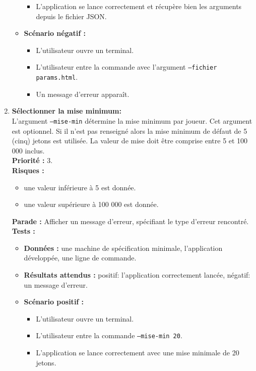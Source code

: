 \documentclass{article}
\newcommand{\code}[1]{\colorbox{light-gray}{\texttt{#1}}}
\begin{document}
\begin{enumerate}
\begin{itemize}
\begin{itemize}
            \item L'application se lance correctement et récupère bien les arguments depuis le fichier JSON.
        \end{itemize}
        \item \textbf{Scénario négatif :}
        \begin{itemize}
            \item L’utilisateur ouvre un terminal.
            \item L’utilisateur entre la commande avec l'argument \code{--fichier params.html}.
            \item Un message d'erreur apparaît.
        \end{itemize}
    \end{itemize}

    \item \textbf{Sélectionner la mise minimum:}\\
    L'argument \code{--mise-min} détermine la mise minimum par joueur. Cet argument est optionnel. Si il n'est pas renseigné alors la mise minimum de défaut de 5 (cinq) jetons est utilisée. La valeur de mise doit être comprise entre 5 et 100 000 inclus. \\
    \textbf{Priorité :} 3. \\
    \textbf{Risques :}
    \begin{itemize}
        \item une valeur inférieure à 5 est donnée.
        \item une valeur supérieure à 100 000 est donnée.
    \end{itemize}
    \textbf{Parade :} Afficher un message d'erreur, spécifiant le type d'erreur rencontré.\\
    \textbf{Tests :}
    \begin{itemize}
        \item \textbf{Données :} une machine de spécification minimale, l'application développée, une ligne de commande.
        \item \textbf{Résultats attendus :} positif: l'application correctement lancée, négatif: un message d'erreur.
        \item \textbf{Scénario positif :}
        \begin{itemize}
            \item L’utilisateur ouvre un terminal.
            \item L’utilisateur entre la commande \code{--mise-min 20}.
            \item L'application se lance correctement avec une mise minimale de 20 jetons.

\end{itemize}
\end{itemize}
\end{enumerate}
\end{document}

